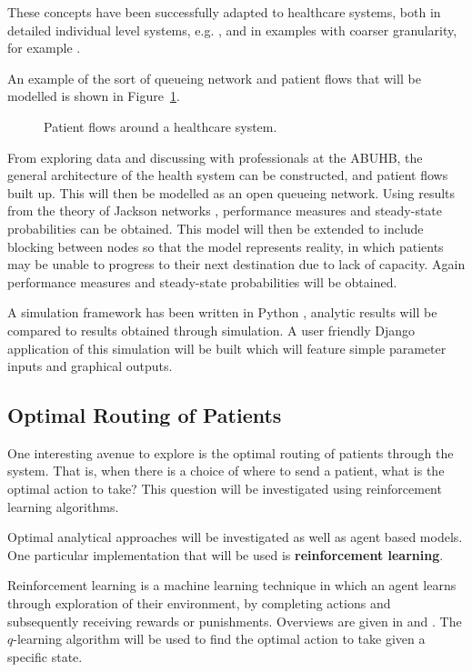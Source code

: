\documentclass{article}
\begin{document}
These concepts have been successfully adapted to healthcare systems, both in detailed individual level systems, e.g. \cite{albinetal90}, \cite{creemerslambrecht07} and in examples with coarser granularity, for example \cite{koizumietal05}.

An example of the sort of queueing network and patient flows that will be modelled is shown in Figure~\ref{fig:healthsystem}.

\begin{figure}[H]
    
    \caption{Patient flows around a healthcare system.}
    \label{fig:healthsystem}
\end{figure}

From exploring data and discussing with professionals at the ABUHB, the general architecture of the health system can be constructed, and patient flows built up.
This will then be modelled as an open queueing network.
Using results from the theory of Jackson networks \cite{You need a reference
here}, performance measures and steady-state probabilities can be obtained.
This model will then be extended to include blocking between nodes so that the model represents reality, in which patients may be unable to progress to their next destination due to lack of capacity.
Again performance measures and steady-state probabilities will be obtained.

A simulation framework has been written in Python \cite{http://www.python.org/},
analytic results will be compared to results obtained through simulation.
A user friendly Django application of this simulation will be built which will
feature simple parameter inputs and graphical outputs.


\subsection{Optimal Routing of Patients}

One interesting avenue to explore is the optimal routing of patients through the system.
That is, when there is a choice of where to send a patient, what is the optimal action to take?
This question will be investigated using reinforcement learning algorithms.

Optimal analytical approaches will be investigated as well as agent based
models. One particular implementation that will be used is
\textbf{reinforcement learning}.

Reinforcement learning is a machine learning technique in which an agent learns
through exploration of their environment, by completing actions and subsequently receiving rewards or punishments.
Overviews are given in \cite{suttonbarto98} and \cite{szepesvari10}.
The \(q\)-learning algorithm will be used to find the optimal action to take given a specific state.
\end{document}
